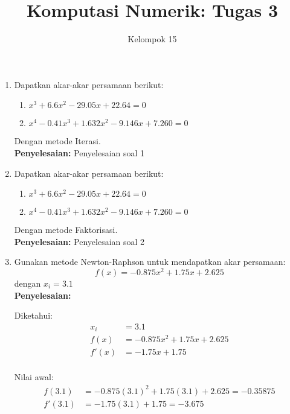 \documentclass{article}
\title{\textbf{Komputasi Numerik: Tugas 3}}
\author{Kelompok 15}
\date{}
\newcommand{\penyelesaian}{\textbf{Penyelesaian: }}
\begin{document}
\maketitle

\begin{enumerate}
    \item Dapatkan akar-akar persamaan berikut: 
    \begin{enumerate}
        \item $x^3 + \num{6,6}x^2 - \num{29,05}x + \num{22,64} = 0$
        \item $x^4 - \num{0,41}x^3 + \num{1,632}x^2 - \num{9,146}x + \num{7,260} = 0$
    \end{enumerate}
    Dengan metode Iterasi. \\
    \penyelesaian Penyelesaian soal 1

    \item Dapatkan akar-akar persamaan berikut: 
    \begin{enumerate}
        \item $x^3 + \num{6,6}x^2 - \num{29,05}x + \num{22,64} = 0$
        \item $x^4 - \num{0,41}x^3 + \num{1,632}x^2 - \num{9,146}x + \num{7,260} = 0$
    \end{enumerate}
    Dengan metode Faktorisasi. \\
    \penyelesaian Penyelesaian soal 2

    \item Gunakan metode Newton-Raphson untuk mendapatkan akar persamaan: \\
    \begin{equation*}
        f(x) = -\num{0,875}x^2 + \num{1,75}x + \num{2,625}
    \end{equation*}
    dengan $x_i = \num{3,1}$ \\
    \penyelesaian

    Diketahui: \\
    \begin{equation*}
    \begin{split}
        x_i & = \num{3,1} \\
        f(x) & = -\num{0,875}x^2 + \num{1,75}x + \num{2,625} \\
        f'(x) & = -\num{1,75}x + \num{1,75} \\ 
    \end{split}
    \end{equation*}

    Nilai awal: \\
    \begin{equation*}
    \begin{split}
        f(\num{3,1}) & = -\num{0,875}(\num{3,1})^2 + \num{1,75}(\num{3,1}) + \num{2,625} = -\num{0,35875} \\
        f'(\num{3,1}) & = -\num{1,75}(\num{3,1}) + \num{1,75} = -\num{3,675} \\
    \end{split}
    \end{equation*}


\end{enumerate}
\end{document}
